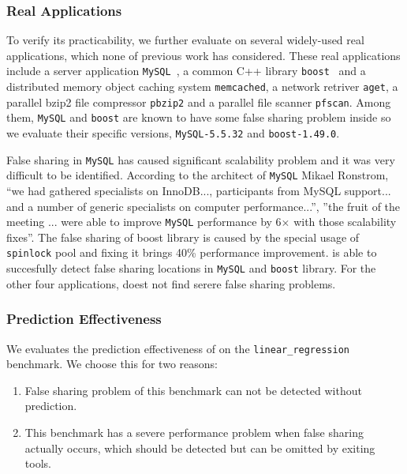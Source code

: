\subsubsection{Real Applications}
To verify its practicability, we further evaluate  
on several widely-used real applications, which none of previous work has considered.  
These real applications include a server application \texttt{MySQL}~\cite{mysql}, 
a common C++ library \texttt{boost}~\cite{libfalsesharing} 
and a distributed memory object caching system \texttt{memcached}, a network retriver \texttt{aget}, 
a parallel bzip2 file compressor \texttt{pbzip2} and a parallel file scanner \texttt{pfscan}.
Among them, \texttt{MySQL} and \texttt{boost} are known to have some false sharing problem inside 
so we evaluate their specific versions, \texttt{MySQL-5.5.32} and
\texttt{boost-1.49.0}.

False sharing in \texttt{MySQL} has caused significant scalability problem and
it was very difficult to be identified. 
According to the architect of \texttt{MySQL} Mikael Ronstrom, ``we had gathered specialists on 
InnoDB..., participants from MySQL support... and a number of generic specialists on 
computer performance...'', ''the fruit of the meeting ... were able to 
improve \texttt{MySQL} performance by 6$\times$ with those scalability fixes''. 
The false sharing of boost library is caused by the special usage of \texttt{spinlock} pool and fixing
it brings 40\% performance improvement. 
 is able to succesfully detect false sharing locations
in \texttt{MySQL} and \texttt{boost} library. 
For the other four applications,  doest not find serere false sharing problems.

\subsubsection{Prediction Effectiveness}
\label{sec:predicteval}

We evaluates the prediction effectiveness of  on the \texttt{linear\_regression} benchmark.
We choose this for two reasons:
\begin{enumerate}
\item
False sharing problem of this benchmark can not be detected without prediction. 

\item
This benchmark has a severe performance problem when false sharing actually occurs, which should be 
detected but can be omitted by exiting tools.
\end{enumerate}

